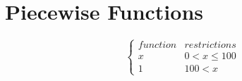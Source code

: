 \documentclass{article}
\begin{document}

\newpage
\section*{Piecewise Functions}

\[ \begin{cases} 
    function & restrictions \\
    x & 0 < x\leq 100 \\
    1 & 100 < x 
 \end{cases}
\]


\end{document}
